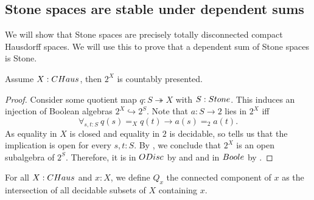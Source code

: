 \subsection{Stone spaces are stable under dependent sums}
We will show that Stone spaces are precisely totally disconnected compact Hausdorff spaces. 
We will use this to prove that a dependent sum of Stone spaces is Stone.

\begin{lemma}\label{AlgebraCompactHausdorffCountablyPresented}
Assume $X:\Chaus$, then $2^X$ is countably presented.
\end{lemma}

\begin{proof}
  Consider some quotient map $q:S\twoheadrightarrow X$ with $S:\Stone$. 
%
  This induces an injection of Boolean algebras $2^X \hookrightarrow 2^S$.
  Note that $a:S\to 2$ lies in $2^X$ iff %
  $$\forall_{s,t:S}\ q(s) =_X q(t) \to a(s) =_2a(t).$$
  As equality in $X$ is closed and equality in $2$ is decidable, so 
  tells us that the implication is open for every $s,t:S$. 
  By , we conclude that 
  $2^X$ is an open subalgebra of $2^S$. 
  Therefore, it is in $\ODisc$ by
   and  
  and in $\Boole$ by .
%
%
%
\end{proof}
\begin{definition}
For all $X:\Chaus$ and $x:X$,
  we define $Q_x$ the connected component of $x$
  as the intersection of all decidable subsets of $X$ containing $x$. 
\end{definition}

